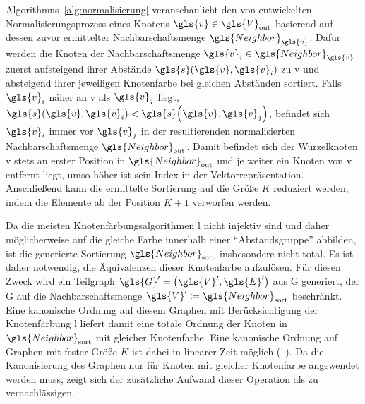 Algorithmus~\ref{alg:normalisierung} veranschaulicht den von \citeauthor{patchy} entwickelten Normalisierungsprozess \bzgl{} eines Knotens $\gls{v} \in \gls{V}_{\mathrm{out}}$ basierend auf dessen zuvor ermittelter Nachbarschaftsmenge $\gls{Neighbor}_{\gls{v}}$.
Dafür werden die Knoten der Nachbarschaftsmenge $\gls{v}_i \in \gls{Neighbor}_{\gls{v}}$ zuerst aufsteigend \bzgl{} ihrer Abstände $\gls{s}\left(\gls{v}, \gls{v}_i\right)$ zu \gls{v} und absteigend \bzgl{} ihrer jeweiligen Knotenfarbe bei gleichen Abständen sortiert.
Falls $\gls{v}_i$ näher an \gls{v} als $\gls{v}_j$ liegt, \dhe{} $\gls{s}\left(\gls{v}, \gls{v}_i\right) < \gls{s}\left(\gls{v}, \gls{v}_j\right)$, befindet sich $\gls{v}_i$ immer vor $\gls{v}_j$ in der resultierenden normalisierten Nachbarschaftsmenge $\gls{Neighbor}_{\mathrm{out}}$.
Damit befindet sich der Wurzelknoten \gls{v} stets an erster Position in $\gls{Neighbor}_{\mathrm{out}}$ und je weiter ein Knoten von \gls{v} entfernt liegt, umso höher ist sein Index in der Vektorrepräsentation.
Anschließend kann die ermittelte Sortierung auf die Größe $K$ reduziert werden, indem die Elemente ab der Position $K+1$ verworfen werden.

Da die meisten Knotenfärbungsalgorithmen \gls{l} nicht injektiv sind und daher möglicherweise auf die gleiche Farbe innerhalb einer \enquote{Abstandsgruppe} abbilden, ist die generierte Sortierung $\gls{Neighbor}_{\mathrm{sort}}$ insbesondere nicht total.
Es ist daher notwendig, die Äquivalenzen dieser Knotenfarbe aufzulösen.
Für diesen Zweck wird ein Teilgraph $\gls{G}^{\prime} = \left(\gls{V}^{\prime}, \gls{E}^{\prime}\right)$ aus \gls{G} generiert, der \gls{G} auf die Nachbarschaftsmenge $\gls{V}^{\prime} \coloneqq \gls{Neighbor}_{\mathrm{sort}}$ beschränkt.
Eine kanonische Ordnung auf diesem Graphen mit Berücksichtigung der Knotenfärbung \gls{l} liefert damit eine totale Ordnung der Knoten in $\gls{Neighbor}_{\mathrm{sort}}$ mit gleicher Knotenfarbe.
Eine kanonische Ordnung auf Graphen mit fester Größe $K$ ist dabei in linearer Zeit möglich (\vgl{}~\cite{patchy}).
Da die Kanonisierung des Graphen nur für Knoten mit gleicher Knotenfarbe angewendet werden muss, zeigt sich der zusätzliche Aufwand dieser Operation als zu vernachlässigen.

